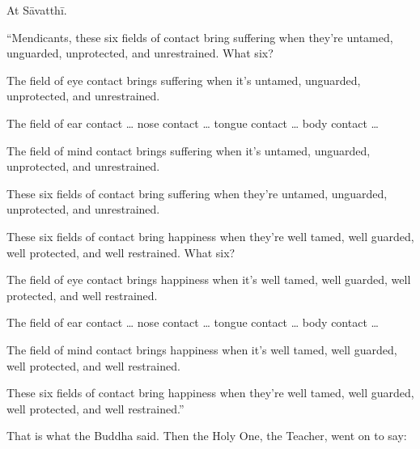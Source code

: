 \documentclass[12pt,openany]{book}%
\begin{document}
At \textsanskrit{Sāvatthī}. 

“Mendicants, these six fields of contact bring suffering when they’re untamed, unguarded, unprotected, and unrestrained. What six? 

The field of eye contact brings suffering when it’s untamed, unguarded, unprotected, and unrestrained. 

The field of ear contact … nose contact … tongue contact … body contact … 

The field of mind contact brings suffering when it’s untamed, unguarded, unprotected, and unrestrained. 

These six fields of contact bring suffering when they’re untamed, unguarded, unprotected, and unrestrained. 

These six fields of contact bring happiness when they’re well tamed, well guarded, well protected, and well restrained. What six? 

The field of eye contact brings happiness when it’s well tamed, well guarded, well protected, and well restrained. 

The field of ear contact … nose contact … tongue contact … body contact … 

The field of mind contact brings happiness when it’s well tamed, well guarded, well protected, and well restrained. 

These six fields of contact bring happiness when they’re well tamed, well guarded, well protected, and well restrained.” 

That is what the Buddha said. Then the Holy One, the Teacher, went on to say: 
\end{document}

